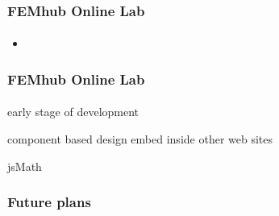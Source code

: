 \documentclass{beamer}
\begin{document}
\begin{frame}
    \frametitle{FEMhub Online Lab}
    \framesubtitle{}

    \begin{itemize}
        \item
    \end{itemize}
\end{frame}

\begin{frame}
    \frametitle{FEMhub Online Lab}
    \framesubtitle{}

    early stage of development

    component based design
     embed inside other web sites


    jsMath
\end{frame}

\begin{frame}
    \frametitle{Future plans}
    \framesubtitle{}

\end{frame}
\end{document}

